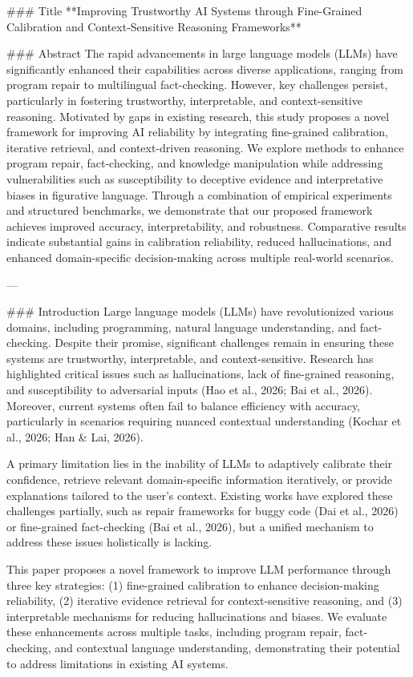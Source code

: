### Title
**Improving Trustworthy AI Systems through Fine-Grained Calibration and Context-Sensitive Reasoning Frameworks**

### Abstract
The rapid advancements in large language models (LLMs) have significantly enhanced their capabilities across diverse applications, ranging from program repair to multilingual fact-checking. However, key challenges persist, particularly in fostering trustworthy, interpretable, and context-sensitive reasoning. Motivated by gaps in existing research, this study proposes a novel framework for improving AI reliability by integrating fine-grained calibration, iterative retrieval, and context-driven reasoning. We explore methods to enhance program repair, fact-checking, and knowledge manipulation while addressing vulnerabilities such as susceptibility to deceptive evidence and interpretative biases in figurative language. Through a combination of empirical experiments and structured benchmarks, we demonstrate that our proposed framework achieves improved accuracy, interpretability, and robustness. Comparative results indicate substantial gains in calibration reliability, reduced hallucinations, and enhanced domain-specific decision-making across multiple real-world scenarios.

---

### Introduction
Large language models (LLMs) have revolutionized various domains, including programming, natural language understanding, and fact-checking. Despite their promise, significant challenges remain in ensuring these systems are trustworthy, interpretable, and context-sensitive. Research has highlighted critical issues such as hallucinations, lack of fine-grained reasoning, and susceptibility to adversarial inputs (Hao et al., 2026; Bai et al., 2026). Moreover, current systems often fail to balance efficiency with accuracy, particularly in scenarios requiring nuanced contextual understanding (Kochar et al., 2026; Han & Lai, 2026).

A primary limitation lies in the inability of LLMs to adaptively calibrate their confidence, retrieve relevant domain-specific information iteratively, or provide explanations tailored to the user's context. Existing works have explored these challenges partially, such as repair frameworks for buggy code (Dai et al., 2026) or fine-grained fact-checking (Bai et al., 2026), but a unified mechanism to address these issues holistically is lacking.

This paper proposes a novel framework to improve LLM performance through three key strategies: (1) fine-grained calibration to enhance decision-making reliability, (2) iterative evidence retrieval for context-sensitive reasoning, and (3) interpretable mechanisms for reducing hallucinations and biases. We evaluate these enhancements across multiple tasks, including program repair, fact-checking, and contextual language understanding, demonstrating their potential to address limitations in existing AI systems.

